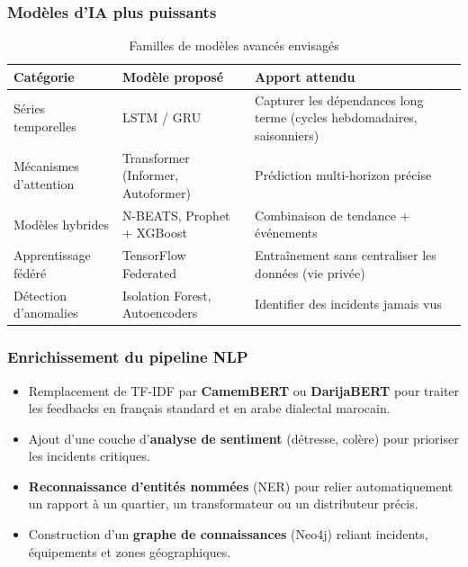 \documentclass[11pt,a4paper]{article}
\begin{document}
\subsubsection{Modèles d'IA plus puissants}

\begin{table}[h!]
\centering
\begin{tabularx}{\textwidth}{lYY}
\toprule
{}
\textbf{Catégorie} & \textbf{Modèle proposé} & \textbf{Apport attendu} \\
\midrule
Séries temporelles & LSTM / GRU & Capturer les dépendances long terme (cycles hebdomadaires, saisonniers) \\
Mécanismes d'attention & Transformer (Informer, Autoformer) & Prédiction multi-horizon précise \\
Modèles hybrides & N-BEATS, Prophet + XGBoost & Combinaison de tendance + événements \\
Apprentissage fédéré & TensorFlow Federated & Entraînement sans centraliser les données (vie privée) \\
Détection d'anomalies & Isolation Forest, Autoencoders & Identifier des incidents jamais vus \\
\bottomrule
\end{tabularx}
\caption{Familles de modèles avancés envisagés}
\end{table}

\subsubsection{Enrichissement du pipeline NLP}
\begin{itemize}
  \item Remplacement de TF-IDF par \textbf{CamemBERT} ou \textbf{DarijaBERT} pour traiter les feedbacks en français standard et en arabe dialectal marocain.
  \item Ajout d'une couche d'\textbf{analyse de sentiment} (détresse, colère) pour prioriser les incidents critiques.
  \item \textbf{Reconnaissance d'entités nommées} (NER) pour relier automatiquement un rapport à un quartier, un transformateur ou un distributeur précis.
  \item Construction d'un \textbf{graphe de connaissances} (Neo4j) reliant incidents, équipements et zones géographiques.
\end{itemize}
\end{document}
